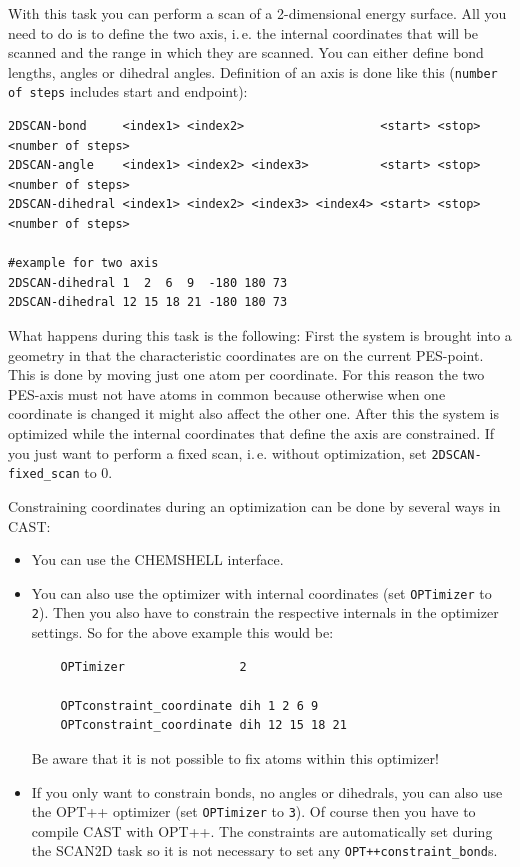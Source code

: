 \documentclass[10pt,a4paper]{article} %
\begin{document}
	With this task you can perform a scan of a 2-dimensional energy surface. All you need to do is to define the two axis, i.\,e. the internal coordinates that will be scanned and the range in which they are scanned. You can either define bond lengths, angles or dihedral angles. Definition of an axis is done like this (\texttt{number of steps} includes start and endpoint):
	
\begin{lstlisting}
2DSCAN-bond     <index1> <index2>                   <start> <stop> <number of steps>
2DSCAN-angle    <index1> <index2> <index3>          <start> <stop> <number of steps>
2DSCAN-dihedral <index1> <index2> <index3> <index4> <start> <stop> <number of steps>

#example for two axis
2DSCAN-dihedral 1  2  6  9  -180 180 73
2DSCAN-dihedral 12 15 18 21 -180 180 73
\end{lstlisting}
	
What happens during this task is the following: First the system is brought into a geometry in that the characteristic coordinates are on the current PES-point. This is done by moving just one atom per coordinate. For this reason the two PES-axis must not have atoms in common because otherwise when one coordinate is changed it might also affect the other one. After this the system is optimized while the internal coordinates that define the axis are constrained. If you just want to perform a fixed scan, i.\,e. without optimization, set \texttt{2DSCAN-fixed\_scan} to 0.

Constraining coordinates during an optimization can be done by several ways in CAST:
\begin{itemize}
	\item You can use the CHEMSHELL interface.
	\item You can also use the optimizer with internal coordinates (set \texttt{OPTimizer} to \texttt{2}).  Then you also have to constrain the respective internals in the optimizer settings. So for the above example this would be:
	\begin{lstlisting}
	OPTimizer                2
	
	OPTconstraint_coordinate dih 1 2 6 9
	OPTconstraint_coordinate dih 12 15 18 21
	\end{lstlisting}
	Be aware that it is not possible to fix atoms within this optimizer!
	\item If you only want to constrain bonds, no angles or dihedrals, you can also use the OPT++ optimizer (set \texttt{OPTimizer} to \texttt{3}). Of course then you have to compile CAST with OPT++. The constraints are automatically set during the SCAN2D task so it is not necessary to set any \texttt{OPT++constraint\_bond}s.
\end{itemize}
\end{document}
